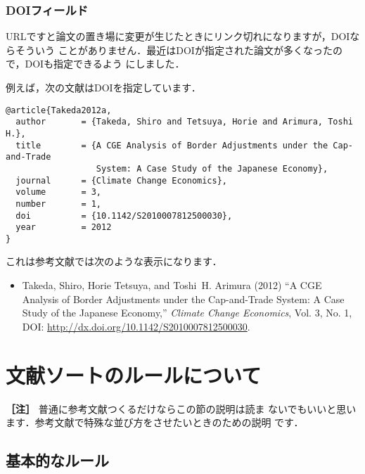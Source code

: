 \documentclass[a4j,10pt]{jarticle}
\begin{document}
\subsubsection{DOIフィールド}

URLですと論文の置き場に変更が生じたときにリンク切れになりますが，DOIならそういう
ことがありません．最近はDOIが指定された論文が多くなったので，DOIも指定できるよう
にしました．

例えば，次の文献はDOIを指定しています．
\begin{verbatim}
@article{Takeda2012a,
  author       = {Takeda, Shiro and Tetsuya, Horie and Arimura, Toshi H.},
  title        = {A CGE Analysis of Border Adjustments under the Cap-and-Trade
                  System: A Case Study of the Japanese Economy},
  journal      = {Climate Change Economics},
  volume       = 3,
  number       = 1,
  doi          = {10.1142/S2010007812500030},
  year         = 2012
}
\end{verbatim}

これは参考文献では次のような表示になります．
\begin{screen}
 \begin{itemize}
  \item Takeda, Shiro, Horie Tetsuya, and Toshi~H. Arimura (2012) ``A CGE Analysis of
  Border Adjustments under the Cap-and-Trade System: A Case Study of the
  Japanese Economy,'' \textit{Climate Change Economics}, Vol. 3, No. 1, DOI:
  \url{http://dx.doi.org/10.1142/S2010007812500030}.
 \end{itemize}
\end{screen}

\section{文献ソートのルールについて}
\label{sec:sort_rule}

\noindent \textbf{［注］} 普通に参考文献つくるだけならこの節の説明は読ま
ないでもいいと思います．参考文献で特殊な並び方をさせたいときのための説明
です．

\subsection{基本的なルール}
\end{document}
